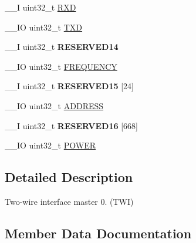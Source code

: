 \begin{DoxyCompactItemize}
\item 
\+\_\+\+\_\+\+I uint32\+\_\+t \hyperlink{struct_n_r_f___t_w_i___type_a90ab1da8f9a2ec89814d7b05ea71b0f7}{R\+X\+D}
\item 
\+\_\+\+\_\+\+I\+O uint32\+\_\+t \hyperlink{struct_n_r_f___t_w_i___type_a7e2441eaf8a7c556478f105357096454}{T\+X\+D}
\item 
\hypertarget{struct_n_r_f___t_w_i___type_aaf95452c1fb7b5540a37a5233f9dddb4}{}\+\_\+\+\_\+\+I uint32\+\_\+t {\bfseries R\+E\+S\+E\+R\+V\+E\+D14}\label{struct_n_r_f___t_w_i___type_aaf95452c1fb7b5540a37a5233f9dddb4}

\item 
\+\_\+\+\_\+\+I\+O uint32\+\_\+t \hyperlink{struct_n_r_f___t_w_i___type_a9a3fa2faa24682120ec9f25ee5c881a5}{F\+R\+E\+Q\+U\+E\+N\+C\+Y}
\item 
\hypertarget{struct_n_r_f___t_w_i___type_a001cb849682a3b8e05bf17e3dd8b91d2}{}\+\_\+\+\_\+\+I uint32\+\_\+t {\bfseries R\+E\+S\+E\+R\+V\+E\+D15} \mbox{[}24\mbox{]}\label{struct_n_r_f___t_w_i___type_a001cb849682a3b8e05bf17e3dd8b91d2}

\item 
\+\_\+\+\_\+\+I\+O uint32\+\_\+t \hyperlink{struct_n_r_f___t_w_i___type_a469a28d2b712f1b3c76ecab4d2612f2b}{A\+D\+D\+R\+E\+S\+S}
\item 
\hypertarget{struct_n_r_f___t_w_i___type_ac26f40025483d6bf6e84f016427c80e3}{}\+\_\+\+\_\+\+I uint32\+\_\+t {\bfseries R\+E\+S\+E\+R\+V\+E\+D16} \mbox{[}668\mbox{]}\label{struct_n_r_f___t_w_i___type_ac26f40025483d6bf6e84f016427c80e3}

\item 
\+\_\+\+\_\+\+I\+O uint32\+\_\+t \hyperlink{struct_n_r_f___t_w_i___type_a12c8fc4872e1fcdcac71bb481e418fe9}{P\+O\+W\+E\+R}
\end{DoxyCompactItemize}


\subsection{Detailed Description}
Two-\/wire interface master 0. (T\+W\+I) 

\subsection{Member Data Documentation}
\hypertarget{struct_n_r_f___t_w_i___type_a469a28d2b712f1b3c76ecab4d2612f2b}{}
